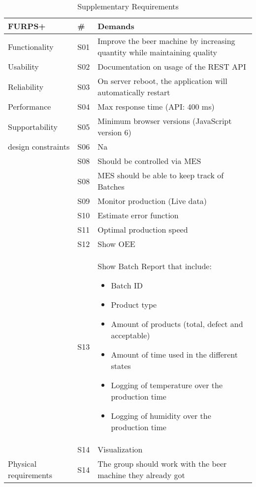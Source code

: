 \begin{table}[ht]
    \begin{tabularx}{\textwidth}{|>{\RaggedRight}p{3.3cm}|>{\RaggedRight}p{0.6cm}|>{\RaggedRight}X|}
        \hline
        \textbf{FURPS+}  & \textbf{\#} & \textbf{Demands} \\
        \hline
        Functionality  	& S01 & Improve the beer machine by increasing quantity while maintaining quality \\
        \hline
        Usability      	& S02 & Documentation on usage of the REST API \\
        \hline
        Reliability    	& S03 & On server reboot, the application will automatically restart \\
        \hline
        Performance    	& S04 & Max response time (API: 400 ms) \\
        \hline
        Supportability 	& S05 & Minimum browser versions (JavaScript version 6)\\
        \hline
        design constraints 	& S06 & Na \\
        \hline
        \multirow{5}{100}{implementation requirements} & S08 & Should be controlled via MES\\
        \cline{2-3}
                & S08 & MES should be able to keep track of Batches\\
        \cline{2-3}
                & S09 & Monitor production (Live data)\\
        \cline{2-3}
                & S10 & Estimate error function\\
        \cline{2-3}
                & S11 & Optimal production speed\\
        \hline
        \multirow{14}{100}{Interface requirements } & S12 & Show OEE \\
        \cline{2-3}
                & S13 & Show Batch Report that include:
            \begin{itemize}
                \item Batch ID
                \item Product type
                \item Amount of products (total, defect and acceptable)
                \item Amount of time used in the different states
                \item Logging of temperature over the production time
                \item Logging of humidity over the production time
            \end{itemize} \\
        \cline{2-3}
            & S14 & Visualization \\
        \hline
        Physical requirements & S14 & The group should work with the beer machine they already got\\
        \hline
    \end{tabularx}
    \caption{Supplementary Requirements} 
    \label{table:Sup_requirements}
\end{table} 

